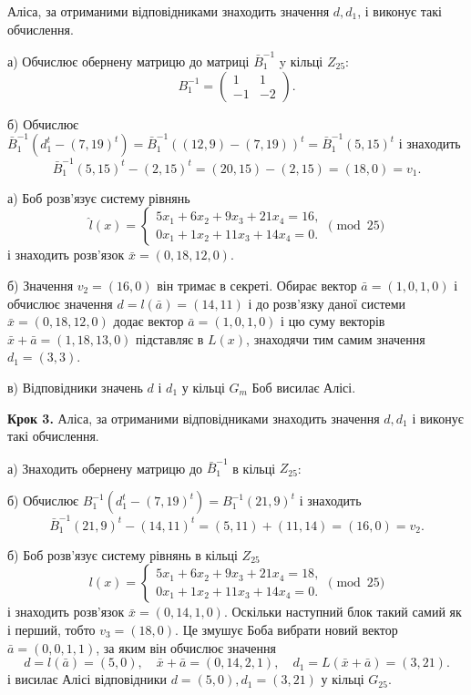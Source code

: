 \documentclass{ceurart}
\begin{document}
{Аліса, за отриманими відповідниками знаходить значення \(d, d_1\),
і виконує такі обчислення.

а) Обчислює обернену матрицю до матриці \(\bar B_1^{-1}\) y кільці \(Z_{25}\):
\[
B_1^{-1}= \begin{pmatrix}
   1 & 1\\
  -1 & -2
\end{pmatrix}.
\]

б) Обчислює \(\bar B_1^{-1}(d_1^t-(7,19)^t)=\bar B_1^{-1}((12,9)-(7,19))^t=\bar B_1^{-1}(5,15)^t\) і знаходить
\[\bar B_1^{-1}(5,15)^t - (2,15)^t= (20,15) - (2,15) = (18,0)=v_1.\]

а) Боб розв'язує систему рівнянь
\[
\hat l(x)= \begin{cases}
  5x_1 + 6x_2 +  9x_3 + 21x_4 = 16,\\
  0x_1 + 1x_2 + 11x_3 + 14x_4 = 0.
\end{cases} \pmod{25}
\]
і знаходить розв'язок \(\bar x = (0,18,12,0)\).

б) Значення \(v_2 = (16,0)\) він тримає в секреті.
Обирає вектор \(\bar a=(1,0,1,0)\) і обчислює значення
\(d=l(\bar a)=(14,11)\) і до розв'язку даної
системи \(\bar x = (0,18,12,0)\) додає вектор \(\bar a = (1,0,1,0)\)
і цю суму векторів \(\bar x + \bar a = (1,18,13,0)\) підставляє в
\(L(x)\), знаходячи тим самим значення \(d_1 = (3,3)\).

в) Відповідники значень \(d\) і \(d_1\) у кільці \(G_m\) Боб
висилає Алісі.

\textbf{Крок 3.} Аліса, за отриманими відповідниками знаходить
значення \(d, d_1\) і виконує такі обчислення.

а) Знаходить обернену матрицю до \(\bar B_1^{-1}\) в кільці \(Z_{25}\):

б) Обчислює \(B_1^{-1}(d_1^t-(7,19)^t)=B_1^{-1}(21,9)^t\) і знаходить
\[\bar B_1^{-1}(21,9)^t-(14,11)^t = (5,11)+(11,14) = (16,0)=v_2.\]

б) Боб розв'язує систему рівнянь в кільці \(Z_{25}\)
\[
l(x)= \begin{cases}
  5x_1 + 6x_2 +  9x_3 + 21x_4 = 18,\\
  0x_1 + 1x_2 + 11x_3 + 14x_4 = 0.
\end{cases} \pmod{25}
\]
і знаходить розв'язок \(\bar x = (0,14,1,0)\).
Оскільки наступний блок такий самий як і перший, тобто \(v_3=(18,0)\).
Це змушує Боба вибрати новий вектор \(\bar a = (0,0,1,1)\), за яким
він обчислює значення
\[
  d=l(\bar a)=(5,0), \quad \bar x+\bar a=(0,14,2,1), \quad d_1=L(\bar x +\bar a)=(3,21).
\]
і висилає Алісі відповідники \(d=(5,0), d_1=(3,21)\) у кільці \(G_{25}\).

}
\end{document}
